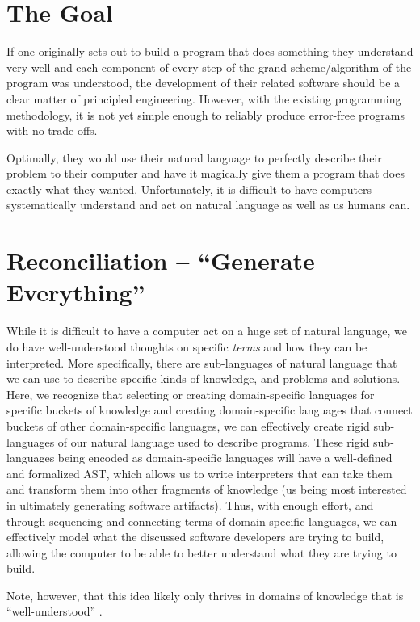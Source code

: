 \section{The Goal}
\label{sec:idlgy:the_goal}

If one originally sets out to build a program that does something they
understand very well and each component of every step of the grand
scheme/algorithm of the program was understood, the development of their related
software should be a clear matter of principled engineering. However, with the
existing programming methodology, it is not yet simple enough to reliably
produce error-free programs with no trade-offs.

Optimally, they would use their natural language to perfectly describe their
problem to their computer and have it magically give them a program that does
exactly what they wanted. Unfortunately, it is difficult to have computers
systematically understand and act on natural language as well as us humans can.

\section{Reconciliation -- ``Generate Everything''}
\label{sec:idlgy:generate_everything}

While it is difficult to have a computer act on a huge set of natural language,
we do have well-understood thoughts on specific \textit{terms} and how they can
be interpreted. More specifically, there are sub-languages of natural language
that we can use to describe specific kinds of knowledge, and problems and
solutions. Here, we recognize that selecting or creating domain-specific
languages for specific buckets of knowledge and creating domain-specific
languages that connect buckets of other domain-specific languages, we can
effectively create rigid sub-languages of our natural language used to describe
programs. These rigid sub-languages being encoded as domain-specific languages
will have a well-defined and formalized AST, which allows us
to write interpreters that can take them and transform them into other fragments
of knowledge (us being most interested in ultimately generating software
artifacts). Thus, with enough effort, and through sequencing and connecting
terms of domain-specific languages, we can effectively model what the discussed
software developers are trying to build, allowing the computer to be able to
better understand what they are trying to build.

Note, however, that this idea likely only thrives in domains of knowledge that
is ``well-understood'' \cite{well-understood}.

